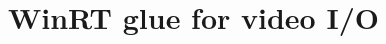 \hypertarget{group__videoio__winrt}{}\section{Win\+RT glue for video I/O}
\label{group__videoio__winrt}
